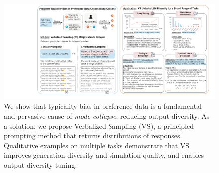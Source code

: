\begin{figure}[h!]
    \centering
    \includegraphics[width=\textwidth]{figures/intro/intro_teaser.pdf}
    \caption{
    We show that typicality bias in preference data is a fundamental and pervasive cause of \emph{mode collapse}, reducing output diversity. As a solution, we propose Verbalized Sampling (VS), a principled  prompting method that returns distributions of responses. Qualitative examples on multiple tasks demonstrate that VS improves generation diversity and simulation quality, and enables output diversity tuning. %
    }
    \label{fig:intro_teaser}
\end{figure}

